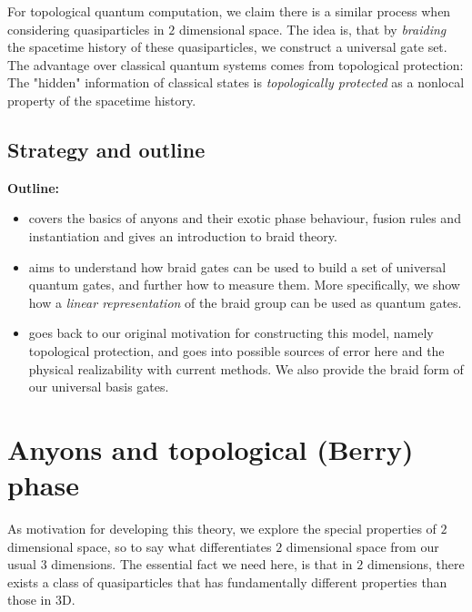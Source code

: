 \documentclass{article}
\begin{document}
For topological quantum computation, we claim there is a similar process when considering quasiparticles in $2$ dimensional space. The idea is, that by {\it braiding} the spacetime history of these quasiparticles, we construct a universal gate set. The advantage over classical quantum systems comes from topological protection: The "hidden" information of classical states is {\it topologically protected} as a nonlocal property of the spacetime history.

\subsection{Strategy and outline}
{\bf Outline:}
\begin{itemize}
  \item[{\bf\cref{AnyonsAndTopologicalBerryPhase}}] covers the basics of anyons and their exotic phase behaviour, fusion rules and instantiation and gives an introduction to braid theory.
  \item[{\bf\cref{BraidGatesAndUniversality}}] aims to understand how braid gates can be used to build a set of universal quantum gates, and further how to measure them. More specifically, we show how a {\it linear representation} of the braid group can be used as quantum gates.
  \item[{\bf\cref{Conclusion}}] goes back to our original motivation for constructing this model, namely topological protection, and goes into possible sources of error here and the physical realizability with current methods. We also provide the braid form of our universal basis gates.
\end{itemize}
\section{Anyons and topological (Berry) phase}
\label{AnyonsAndTopologicalBerryPhase}

As motivation for developing this theory, we explore the special properties of $2$ dimensional space, so to say what differentiates $2$ dimensional space from our usual $3$ dimensions. The essential fact we need here, is that in $2$ dimensions, there exists a class of quasiparticles that has fundamentally different properties than those in $3$D.
\end{document}
